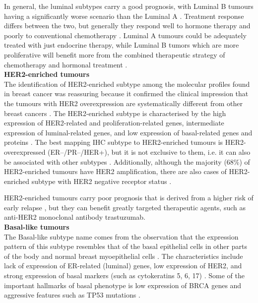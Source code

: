 In general, the luminal subtypes carry a good prognosis, with Luminal B tumours having a significantly worse scenario than the Luminal A \cite{Srlie2003RepeatedSets}. Treatment response differs between the two, but generally they respond well to hormone therapy and poorly to conventional chemotherapy \cite{brenton2005molecular}. Luminal A tumours could be adequately treated with just endocrine therapy, while Luminal B tumors which are more proliferative will benefit more from the combined therapeutic strategy of chemotherapy and hormonal treatment \cite{paik2004multigene}.\\


\textbf{HER2-enriched tumours}\\
The identification of HER2-enriched subtype among the molecular profiles found in breast cancer was reassuring because it confirmed the clinical impression that the tumours with HER2 overexpression are systematically different from other breast cancers \cite{brenton2005molecular}. 
The HER2-enriched subtype is characterised by the high expression of HER2-related and proliferation-related genes, intermediate expression of luminal-related genes, and low expression of basal-related genes and proteins \cite{Vidal2017}. The best mapping IHC subtype to HER2-enriched tumours is HER2-overexpressed  (ER--/PR--/HER+), but it is not exclusive to them, i.e. it can also be associated with other subtypes \cite{Dai2015}. Additionally, although the majority (68\%) of HER2-enriched tumours have HER2 amplification, there are also cases of HER2-enriched subtype with HER2 negative receptor status \cite{Vidal2017}.

HER2-enriched tumours carry poor prognosis that is derived from a higher risk of early relapse \cite{carey2007triple}, but they can benefit greatly targeted therapeutic agents, such as anti-HER2 monoclonal antibody trastuzumab. \\

\newpage
\textbf{Basal-like tumours}\\
The Basal-like subtype name comes from the observation that the expression pattern of this subtype resembles that of the basal epithelial cells in other parts of the body and normal breast myoepithelial cells \cite{perou2000molecular, brenton2005molecular}. The characteristics include lack of expression of ER-related (luminal) genes, low expression of HER2, and strong expression of basal markers (such as cytokeratins 5, 6, 17) \cite{sotiriou2003breast}. Some of the important hallmarks of basal phenotype is low expression of BRCA genes \cite{callagy2003molecular} and aggressive features such as TP53 mutations \cite{Srlie2001GeneImplications}. 

